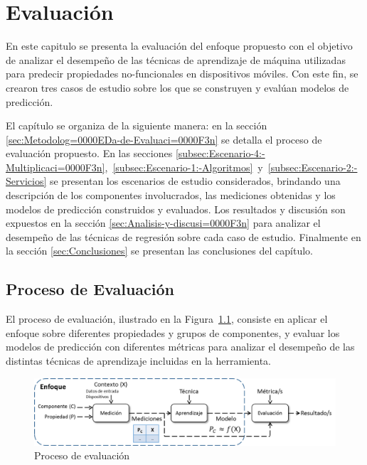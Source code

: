 
\chapter{Evaluación\label{chap:Evaluaci=0000F3n}}

En este capitulo se presenta la evaluación del enfoque propuesto con
el objetivo de analizar el desempeño de las técnicas de aprendizaje
de máquina utilizadas para predecir propiedades no-funcionales en
dispositivos móviles. Con este fin, se crearon tres casos de estudio
sobre los que se construyen y evalúan modelos de predicción.

El capítulo se organiza de la siguiente manera: en la sección \ref{sec:Metodolog=0000EDa-de-Evaluaci=0000F3n}
se detalla el proceso de evaluación propuesto. En las secciones \ref{subsec:Escenario-4:-Multiplicaci=0000F3n},~\ref{subsec:Escenario-1:-Algoritmos}~y~\ref{subsec:Escenario-2:-Servicios}
se presentan los escenarios de estudio considerados, brindando una
descripción de los componentes involucrados, las mediciones obtenidas
y los modelos de predicción construidos y evaluados. Los resultados
y discusión son expuestos en la sección \ref{sec:Analisis-y-discusi=0000F3n}
para analizar el desempeño de las técnicas de regresión sobre cada
caso de estudio. Finalmente en la sección \ref{sec:Conclusiones}
se presentan las conclusiones del capítulo. 


\section{Proceso de Evaluación\label{sec:Metodolog=0000EDa-de-Evaluaci=0000F3n}}

El proceso de evaluación, ilustrado en la Figura~\ref{fig:Proceso-de-evaluaci=0000F3n},
consiste en aplicar el enfoque sobre diferentes propiedades y grupos
de componentes, y evaluar los modelos de predicción con diferentes
métricas para analizar el desempeño de las distintas técnicas de aprendizaje
incluidas en la herramienta.

\begin{figure}
\includegraphics[scale=0.6]{images/Proceso-de-evaluacion}

\caption{Proceso de evaluación\label{fig:Proceso-de-evaluaci=0000F3n}}
\end{figure}


